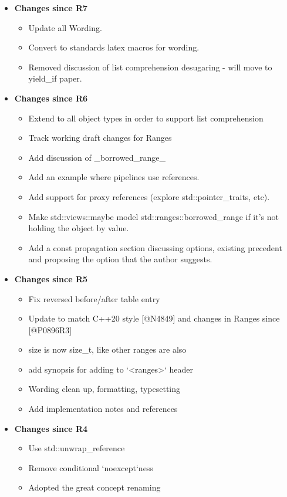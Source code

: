 \documentclass[a4paper,10pt,oneside,openany,final,article]{memoir}
\begin{document}
\begin{itemize}
\begin{itemize}
  \end{itemize}
\item \textbf{Changes since R7}
  \begin{itemize}
  \item Update all Wording.
  \item Convert to standards latex macros for wording.
  \item Removed discussion of list comprehension desugaring - will move to yield_if paper.
  \end{itemize}
\item \textbf{Changes since R6}
  \begin{itemize}
  \item Extend to all object types in order to support list comprehension
  \item Track working draft changes for Ranges
  \item Add discussion of _borrowed_range_
  \item Add an example where pipelines use references.
  \item Add support for proxy references (explore std::pointer_traits, etc).
  \item Make std::views::maybe model std::ranges::borrowed_range if it's not holding the object by value.
  \item Add a const propagation section discussing options, existing precedent and proposing the option that the author suggests.
  \end{itemize}
\item \textbf{Changes since R5}
  \begin{itemize}
  \item Fix reversed before/after table entry
  \item Update to match C++20 style [@N4849] and changes in Ranges since [@P0896R3]
  \item size is now size_t, like other ranges are also
  \item add synopsis for adding to `<ranges>` header
  \item Wording clean up, formatting, typesetting
  \item Add implementation notes and references
  \end{itemize}
\item \textbf{Changes since R4}
  \begin{itemize}
  \item Use std::unwrap\_reference
  \item Remove conditional `noexcept`ness
  \item Adopted the great concept renaming

\end{itemize}
\end{itemize}
\end{document}
